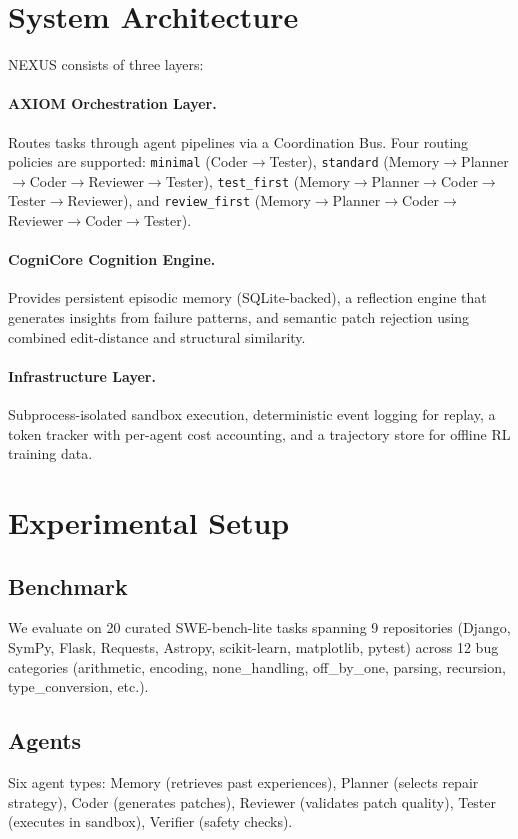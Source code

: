 \documentclass[11pt]{article}
\begin{document}
\section{System Architecture}

NEXUS consists of three layers:

\paragraph{AXIOM Orchestration Layer.}
Routes tasks through agent pipelines via a Coordination Bus.
Four routing policies are supported:
\texttt{minimal} (Coder$\to$Tester),
\texttt{standard} (Memory$\to$Planner$\to$Coder$\to$Reviewer$\to$Tester),
\texttt{test\_first} (Memory$\to$Planner$\to$Coder$\to$Tester$\to$Reviewer),
and \texttt{review\_first} (Memory$\to$Planner$\to$Coder$\to$Reviewer$\to$Coder$\to$Tester).

\paragraph{CogniCore Cognition Engine.}
Provides persistent episodic memory (SQLite-backed), a reflection engine
that generates insights from failure patterns, and semantic patch rejection
using combined edit-distance and structural similarity.

\paragraph{Infrastructure Layer.}
Subprocess-isolated sandbox execution, deterministic event logging for
replay, a token tracker with per-agent cost accounting, and a trajectory
store for offline RL training data.

\section{Experimental Setup}

\subsection{Benchmark}
We evaluate on 20 curated SWE-bench-lite tasks spanning 9 repositories
(Django, SymPy, Flask, Requests, Astropy, scikit-learn, matplotlib, pytest)
across 12 bug categories (arithmetic, encoding, none\_handling, off\_by\_one,
parsing, recursion, type\_conversion, etc.).

\subsection{Agents}
Six agent types: Memory (retrieves past experiences), Planner (selects
repair strategy), Coder (generates patches), Reviewer (validates patch
quality), Tester (executes in sandbox), Verifier (safety checks).
\end{document}
